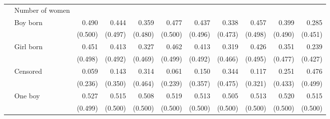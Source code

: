 \begin{table}[htp]
\begin{center}
\begin{scriptsize}
\begin{threeparttable}
\begin{tabular} {@{} c l D{.}{.}{1.3} D{.}{.}{1.3} D{.}{.}{1.3} D{.}{.}{1.3} D{.}{.}{1.3} D{.}{.}{1.3} D{.}{.}{1.3} D{.}{.}{1.3} D{.}{.}{1.3} @{}}
                    &Number of women     &  &  &  &  &  &  &  &  &  \\
                    \addlinespace
\midrule
{}
                    & Boy born            &       0.490         &       0.444         &       0.359         &       0.477         &       0.437         &       0.338         &       0.457         &       0.399         &       0.285         \\
                    &                     &     (0.500)         &     (0.497)         &     (0.480)         &     (0.500)         &     (0.496)         &     (0.473)         &     (0.498)         &     (0.490)         &     (0.451)         \\
                    & Girl born           &       0.451         &       0.413         &       0.327         &       0.462         &       0.413         &       0.319         &       0.426         &       0.351         &       0.239         \\
                    &                     &     (0.498)         &     (0.492)         &     (0.469)         &     (0.499)         &     (0.492)         &     (0.466)         &     (0.495)         &     (0.477)         &     (0.427)         \\
                    & Censored            &       0.059         &       0.143         &       0.314         &       0.061         &       0.150         &       0.344         &       0.117         &       0.251         &       0.476         \\
                    &                     &     (0.236)         &     (0.350)         &     (0.464)         &     (0.239)         &     (0.357)         &     (0.475)         &     (0.321)         &     (0.433)         &     (0.499)         \\
                    & One boy             &       0.527         &       0.515         &       0.508         &       0.519         &       0.513         &       0.505         &       0.513         &       0.520         &       0.515         \\
                    &                     &     (0.499)         &     (0.500)         &     (0.500)         &     (0.500)         &     (0.500)         &     (0.500)         &     (0.500)         &     (0.500)         &     (0.500)         \\

\end{tabular}
\end{threeparttable}
\end{scriptsize}
\end{center}
\end{table}
